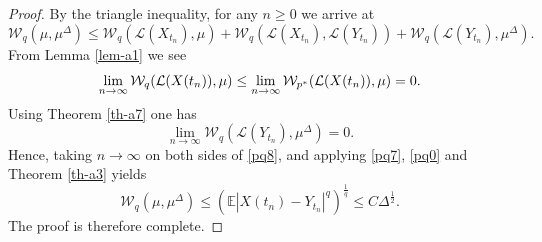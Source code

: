 \documentclass[preprint,12pt,compress]{elsarticle}
\begin{document}
\begin{proof}
By the triangle inequality, for any $n \ge 0$ we arrive at
\begin{equation}  \label{pq8}
	{\mathcal{W}_q}(\mu ,{\mu^\Delta }) \le {\mathcal{W}_q}(\mathcal{L}({X_{{t_n}}}), \mu) + {\mathcal{W}_q}(\mathcal{L}({X_{{t_n}}}),\mathcal{L}({Y_{{t_n}}})) + {\mathcal{W}_q}(\mathcal{L}({Y_{{t_n}}}),{\mu^\Delta }).
\end{equation}
From Lemma \ref{lem-a1} we see
\begin{equation} \label{pq7}
	 \mathop {\lim }\limits_{n \to \infty } {{\cal W}_q}({\cal L}(X({t_n})),\mu ) \le \mathop {\lim }\limits_{n \to \infty } {{\cal W}_{{p^*}}}({\cal L}(X({t_n})),\mu ) = 0 .
\end{equation}
Using Theorem \ref{th-a7} one has
\begin{equation}  \label{pq0}
	\mathop {\lim }\limits_{n \to \infty } {\mathcal{W}_q}(\mathcal{L}({Y_{{t_n}}}),{\mu^\Delta }) = 0.
\end{equation}
Hence, taking $n \to \infty$ on both sides of \eqref{pq8}, and applying \eqref{pq7}, \eqref{pq0} and Theorem \ref{th-a3} yields
\begin{equation*}
	{\mathcal{W}_q}(\mu ,{\mu^\Delta }) \le {\left( {\mathbb{E}{{\left| {X({t_n}) - {Y_{{t_n}}}} \right|}^q}} \right)^{\frac{1}{q}}} \le C{\Delta ^{\frac{1}{2}}} .
\end{equation*}
The proof is therefore complete.

\end{proof}


	







\end{document}
